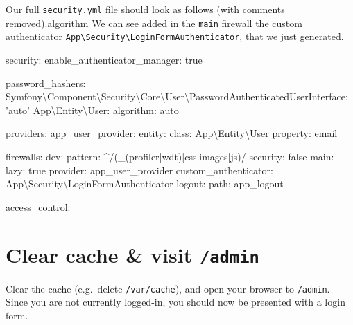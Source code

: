 \documentclass[a4paperpaper,openright]{book}
\newenvironment{Shaded}{}{}
\newcommand{\AttributeTok}[1]{\textcolor[rgb]{0.49,0.56,0.16}{#1}}
\newcommand{\CharTok}[1]{\textcolor[rgb]{0.25,0.44,0.63}{#1}}
\newcommand{\FunctionTok}[1]{\textcolor[rgb]{0.02,0.16,0.49}{#1}}
\newcommand{\StringTok}[1]{\textcolor[rgb]{0.25,0.44,0.63}{#1}}
\begin{document}
Our full \texttt{security.yml} file should look as follows (with
comments removed).algorithm We can see added in the \texttt{main}
firewall the custom authenticator
\texttt{App\textbackslash{}Security\textbackslash{}LoginFormAuthenticator},
that we just generated.

\begin{Shaded}
\begin{Highlighting}[]
\FunctionTok{security:}
    \FunctionTok{enable_authenticator_manager:}\AttributeTok{ }\CharTok{true}

    \FunctionTok{password_hashers:}
        \FunctionTok{Symfony\textbackslash{}Component\textbackslash{}Security\textbackslash{}Core\textbackslash{}User\textbackslash{}PasswordAuthenticatedUserInterface:}\AttributeTok{ }\StringTok{'auto'}
        \FunctionTok{App\textbackslash{}Entity\textbackslash{}User:}
            \FunctionTok{algorithm:}\AttributeTok{ auto}

    \FunctionTok{providers:}
        \FunctionTok{app_user_provider:}
            \FunctionTok{entity:}
                \FunctionTok{class:}\AttributeTok{ App\textbackslash{}Entity\textbackslash{}User}
                \FunctionTok{property:}\AttributeTok{ email}

    \FunctionTok{firewalls:}
        \FunctionTok{dev:}
            \FunctionTok{pattern:}\AttributeTok{ ^/(_(profiler|wdt)|css|images|js)/}
            \FunctionTok{security:}\AttributeTok{ }\CharTok{false}
        \FunctionTok{main:}
            \FunctionTok{lazy:}\AttributeTok{ }\CharTok{true}
            \FunctionTok{provider:}\AttributeTok{ app_user_provider}
            \FunctionTok{custom_authenticator:}\AttributeTok{ App\textbackslash{}Security\textbackslash{}LoginFormAuthenticator}
            \FunctionTok{logout:}
                \FunctionTok{path:}\AttributeTok{ app_logout}

    \FunctionTok{access_control:}
\end{Highlighting}
\end{Shaded}

\hypertarget{clear-cache-visit-admin}{%
\section{\texorpdfstring{Clear cache \& visit
\texttt{/admin}}{Clear cache \& visit /admin}}\label{clear-cache-visit-admin}}

Clear the cache (e.g.~delete \texttt{/var/cache}), and open your browser
to \texttt{/admin}. Since you are not currently logged-in, you should
now be presented with a login form.
\end{document}
